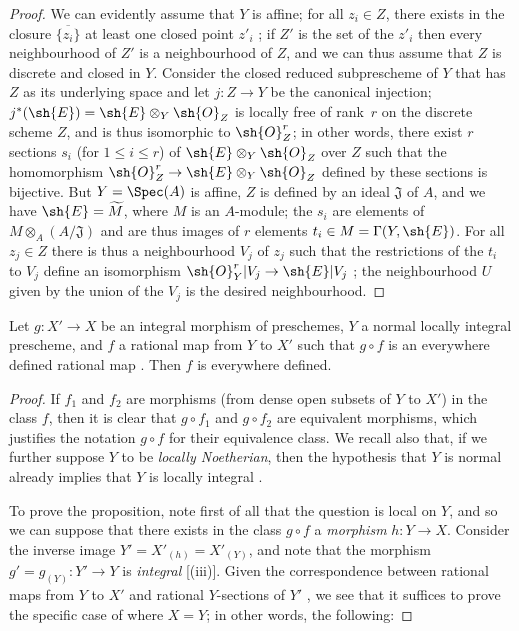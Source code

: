 \begin{proof}
We can evidently assume that $Y$ is affine;
for all $z_i\in Z$, there exists in the closure $\overline{\{z_i\}}$ at least one closed point $z'_i$ ;
if $Z'$ is the set of the $z'_i$ then every neighbourhood of $Z'$ is a neighbourhood of $Z$, and we can thus assume that $Z$ is discrete and closed in $Y$.
Consider the closed reduced subprescheme of $Y$ that has $Z$ as its underlying space  and let $j:Z\to Y$ be the canonical injection;
$j^*(\sh{E})=\sh{E}\otimes_Y\sh{O}_Z$ is locally free of rank~$r$ on the discrete scheme $Z$, and is thus isomorphic to $\sh{O}_Z^r$;
in other words, there exist $r$ sections $s_i$ (for $1\leq i\leq r$) of $\sh{E}\otimes_Y\sh{O}_Z$ over $Z$ such that the homomorphism $\sh{O}_Z^r\to\sh{E}\otimes_Y\sh{O}_Z$ defined by these sections is bijective.
But $Y=\Spec(A)$ is affine, $Z$ is defined by an ideal $\mathfrak{J}$ of $A$, and we have $\sh{E}=\widetilde{M}$, where $M$ is an $A$-module;
the $s_i$ are elements of $M\otimes_A(A/\mathfrak{J})$ and are thus images of $r$ elements $t_i\in M=\Gamma(Y,\sh{E})$.
For all $z_j\in Z$ there is thus a neighbourhood $V_j$ of $z_j$ such that the restrictions of the $t_i$ to $V_j$ define an isomorphism $\sh{O}_Y^r|V_j\to\sh{E}|V_j$ ;
the neighbourhood $U$ given by the union of the $V_j$ is the desired neighbourhood.
\end{proof}

\begin{proposition}[6.1.13]
\label{II.6.1.13}
Let $g:X'\to X$ be an integral morphism of preschemes, $Y$ a normal locally integral prescheme, and $f$ a rational map from $Y$ to $X'$ such that $g\circ f$ is an everywhere defined rational map .
Then $f$ is everywhere defined.
\end{proposition}

\begin{proof}
If $f_1$ and $f_2$ are morphisms (from dense open subsets of $Y$ to $X'$) in the class $f$, then it is clear that $g\circ f_1$ and $g\circ f_2$ are equivalent morphisms, which justifies the notation $g\circ f$ for their equivalence class.
We recall also that, if we further suppose $Y$ to be \emph{locally Noetherian}, then the hypothesis that $Y$ is normal already implies that $Y$ is locally integral .

To prove the proposition, note first of all that the question is local on $Y$, and so we can suppose that there exists in the class $g\circ f$ a \emph{morphism} $h:Y\to X$.
Consider the inverse image $Y'=X'_{(h)}=X'_{(Y)}$, and note that the morphism $g'=g_{(Y)}:Y'\to Y$ is \emph{integral} [(iii)].
Given the correspondence between rational maps from $Y$ to $X'$ and rational $Y$-sections of $Y'$ , we see that it suffices to prove the specific case of  where $X=Y$; in other words, the following:
\end{proof}

